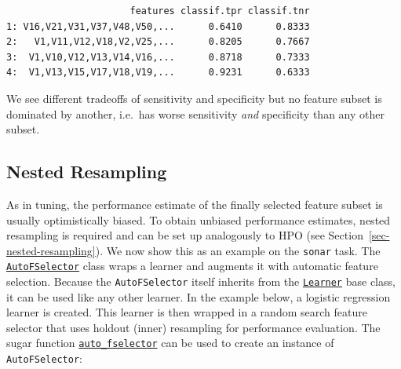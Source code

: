 \begin{Shaded}
\begin{Highlighting}[]
\SpecialCharTok{$}
\end{Highlighting}
\end{Shaded}

\begin{verbatim}
                      features classif.tpr classif.tnr
1: V16,V21,V31,V37,V48,V50,...      0.6410      0.8333
2:   V1,V11,V12,V18,V2,V25,...      0.8205      0.7667
3:  V1,V10,V12,V13,V14,V16,...      0.8718      0.7333
4:  V1,V13,V15,V17,V18,V19,...      0.9231      0.6333
\end{verbatim}

We see different tradeoffs of sensitivity and specificity but no feature
subset is dominated by another, i.e.~has worse sensitivity \emph{and}
specificity than any other subset.

\hypertarget{sec-autofselect}{%
\subsection{Nested Resampling}\label{sec-autofselect}}

As in tuning, the performance estimate of the finally selected feature
subset is usually optimistically biased. To obtain unbiased performance
estimates, nested resampling is required and can be set up analogously
to HPO (see Section~\ref{sec-nested-resampling}). We now show this as an
example on the \texttt{sonar} task. The
\href{https://mlr3fselect.mlr-org.com/reference/AutoFSelector.html}{\texttt{AutoFSelector}}
class wraps a learner and augments it with automatic feature selection.
Because the \texttt{AutoFSelector} itself inherits from the
\href{https://mlr3.mlr-org.com/reference/Learner.html}{\texttt{Learner}}
base class, it can be used like any other learner. In the example below,
a logistic regression learner is created. This learner is then wrapped
in a random search feature selector that uses holdout (inner) resampling
for performance evaluation. The sugar function
\href{https://mlr3fselect.mlr-org.com/reference/auto_fselector.html}{\texttt{auto\_fselector}}
can be used to create an instance of \texttt{AutoFSelector}:

